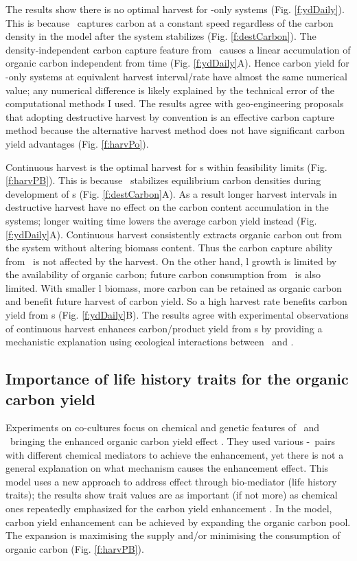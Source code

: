 \documentclass[../thesis.tex]{subfiles} %
\begin{document}
The results show there is no optimal harvest for \phy-only systems (Fig. \ref{f:ydDaily}).  This is because \phy\ captures carbon at a constant speed regardless of the carbon density in the model after the system stabilizes (Fig. \ref{f:destCarbon}).  The density-independent carbon capture feature from \phy\ causes a linear accumulation of organic carbon independent from time (Fig. \ref{f:ydDaily}A).  Hence carbon yield for \phy-only systems at equivalent harvest interval/rate have almost the same numerical value; any numerical difference is likely explained by the technical error of the computational methods I used.  The results agree with geo-engineering proposals that adopting destructive harvest by convention is an effective carbon capture method because the alternative harvest method does not have significant carbon yield advantages (Fig. \ref{f:harvPo}).

Continuous harvest is the optimal harvest for \pbs s within feasibility limits (Fig. \ref{f:harvPB}).  This is because \bac\ stabilizes equilibrium carbon densities during development of \pbs s (Fig. \ref{f:destCarbon}A).  As a result longer harvest intervals in destructive harvest have no effect on the carbon content accumulation in the systems; longer waiting time lowers the average carbon yield instead (Fig. \ref{f:ydDaily}A).  Continuous harvest consistently extracts organic carbon out from the system without altering biomass content.  Thus the carbon capture ability from \phy\ is not affected by the harvest.  On the other hand, \bac l growth is limited by the availability of organic carbon; future carbon consumption from \bac\ is also limited.  With smaller \bac l biomass, more carbon can be retained as organic carbon and benefit future harvest of carbon yield.  So a high harvest rate benefits carbon yield from \pbs s (Fig. \ref{f:ydDaily}B).  The results agree with experimental observations of continuous harvest enhances carbon/product yield from \pbs s \autocite{kim2008anaerobic,choix2012enhanced1,choix2012enhanced2,leyva2014accumulation} by providing a mechanistic explanation using ecological interactions between \phy\ and \bac.

\subsection{Importance of life history traits for the organic carbon yield}
Experiments on co-cultures focus on chemical and genetic features of \phy\ and \bac\ bringing the enhanced organic carbon yield effect \autocite{seyedsayamdost2011roseobacticides,durham2015cryptic,amin2009photolysis}.  They used various \phy-\bac\ pairs with different chemical mediators to achieve the enhancement, yet there is not a general explanation on what mechanism causes the enhancement effect.  This model uses a new approach to address effect through bio-mediator (life history traits); the results show trait values are as important (if not more) as chemical ones repeatedly emphasized for the carbon yield enhancement \autocite{fuentes2016impact}.  In the model, carbon yield enhancement can be achieved by expanding the organic carbon pool.  The expansion is maximising the supply and/or minimising the consumption of organic carbon (Fig. \ref{f:harvPB}).
\end{document}
